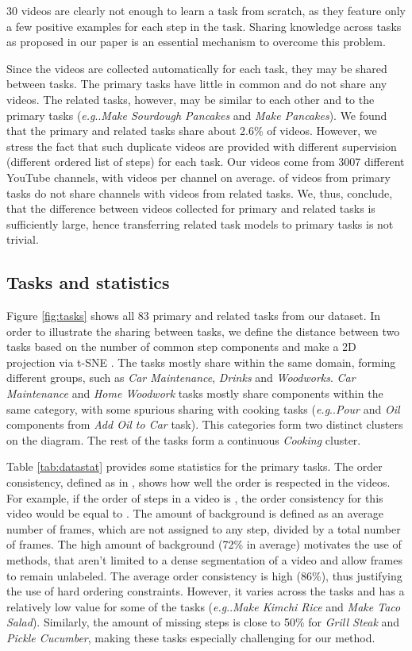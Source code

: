 \documentclass[10pt,twocolumn,letterpaper]{article}
\makeatletter
\DeclareRobustCommand\onedot{\futurelet\@let@token\@onedot}
\def\@onedot{\ifx\@let@token.\else.\null\fi\xspace}
\def\eg{\emph{e.g}\onedot} \def\Eg{\emph{E.g}\onedot}
\makeatother
\begin{document}
30 videos are clearly not enough to learn a task from scratch, as they feature only a few positive examples for each step in the task. Sharing knowledge across tasks as proposed in our paper is an essential mechanism to overcome this problem.

Since the videos are collected automatically for each task, they may be shared between tasks.
The primary tasks have little in common and do not share any videos. The related tasks, however, may be similar to each other and to the primary tasks (\eg \textit{Make Sourdough Pancakes} and \textit{Make Pancakes}).
We found that the primary and related tasks share about 2.6\% of videos.
However, we stress the fact that such duplicate videos are provided with different supervision (different ordered list of steps) for each task.
Our videos come from 3007 different YouTube channels, with  videos per channel on average.  of videos from primary tasks do not share channels with videos from related tasks. We, thus, conclude, that the difference between videos collected for primary and related tasks is sufficiently large,
hence transferring related task models to primary tasks is not trivial.

\subsection{Tasks and statistics}
Figure \ref{fig:tasks} shows all 83 primary and related tasks from our dataset.
In order to illustrate the sharing between tasks, we define the distance between two tasks based on the number of common step components and make a 2D projection via t-SNE .
The tasks mostly share within the same domain, forming different groups, such as \textit{Car Maintenance}, \textit{Drinks} and \textit{Woodworks}.
\textit{Car Maintenance} and \textit{Home Woodwork} tasks mostly share components within the same category, with some spurious sharing with cooking tasks (\eg \textit{Pour} and \textit{Oil} components from \textit{Add Oil to Car} task).
This categories form two distinct clusters on the diagram.
The rest of the tasks form a continuous \textit{Cooking} cluster.

Table \ref{tab:datastat} provides some statistics for the primary tasks.
The order consistency, defined as in , shows how well the order is respected in the videos. For example, if the order of steps in a video is , the order consistency for this video would be equal to .
The amount of background is defined as an average number of frames, which are not assigned to any step, divided by a total number of frames. The high amount of background (72\% in average) motivates the use of methods, that aren't limited to a dense segmentation of a video and allow frames to remain unlabeled.
The average order consistency is high (86\%), thus justifying the use of hard ordering constraints. However, it varies across the tasks and has a relatively low value for some of the tasks (\eg \textit{Make Kimchi Rice} and \textit{Make Taco Salad}).
Similarly, the amount of missing steps is close to 50\% for \textit{Grill Steak} and \textit{Pickle Cucumber}, making these tasks especially challenging for our method.
\end{document}
